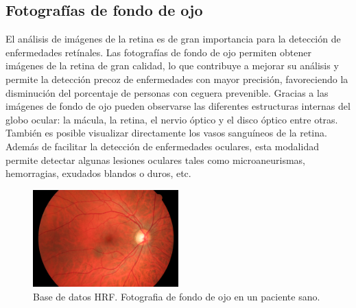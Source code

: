 
\subsection{Fotograf\'ias de fondo de ojo}

El an\'alisis de im\'agenes de la retina es de gran importancia para la detecci\'on de enfermedades ret\'inales. Las fotograf\'ias de fondo de ojo permiten obtener im\'agenes de la retina de gran calidad, lo que contribuye a mejorar su an\'alisis y permite la detecci\'on precoz de enfermedades con mayor precisi\'on, favoreciendo la disminuci\'on del porcentaje de personas con ceguera prevenible. \cite{wang2015fundus} 
Gracias a las im\'agenes de fondo de ojo pueden observarse las diferentes estructuras internas del globo ocular: la m\'acula, la retina, el nervio \'optico y el disco \'optico entre otras. Tambi\'en es posible visualizar directamente los vasos sangu\'ineos de la retina. Adem\'as de facilitar la detecci\'on de enfermedades oculares, esta modalidad permite detectar algunas lesiones oculares tales como microaneurismas, hemorragias, exudados blandos o duros, etc. \cite{haddock2013simple}

\begin{figure}[H]
	{
	\centering
	\includegraphics[width=0.5\textwidth]{Figures/01_h}
	\caption[Fotografia de fondo de ojo]{Base de datos HRF. Fotografia de fondo de ojo en un paciente sano.}
	\label{fig:FotoFondoOjo}
	}
\end{figure}

